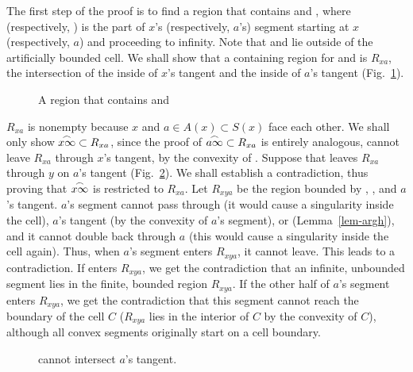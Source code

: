 The first step of the proof is to find a region that contains
 and , where  (respectively, 
) is the part of
$x$'s (respectively, $a$'s) segment starting at $x$ (respectively, $a$) 
and proceeding to infinity.
Note that  and  lie outside of the 
artificially bounded cell.
We shall show that a containing region for  and 
 is 
$R_{xa}$, the intersection of the inside of $x$'s tangent and the inside 
of $a$'s tangent 
(Fig.~\ref{fig-ax}).
%
\begin{figure}[tbp]\vspace{2in}\caption{A region that contains 
 and }\label{fig-ax}\end{figure}
%
$R_{xa}$ is nonempty because $x$ and $a \in A(x) \subset S(x)$ face each 
other.
We shall only show $\mbox{$\stackrel{\frown}{x\infty}$} \subset R_{xa}$, since the proof of 
$\mbox{$\stackrel{\frown}{a\infty}$} \subset R_{xa}$ is entirely analogous, 
 cannot leave $R_{xa}$ through $x$'s tangent, 
by the convexity of .
Suppose that  leaves $R_{xa}$ through
$y$ on $a$'s tangent (Fig.~\ref{fig.chick}).
We shall establish a contradiction, thus proving that $\mbox{$\stackrel{\frown}{x\infty}$}$ is 
restricted
to $R_{xa}$.
Let $R_{xya}$ be the region bounded by , , and $a$'s 
tangent.
$a$'s segment cannot pass through 
(it would cause a singularity inside the cell), $a$'s tangent (by 
the convexity of $a$'s segment), or  (Lemma~\ref{lem-argh}),
and it cannot double back through $a$
(this would cause a singularity inside the cell again).
Thus, when $a$'s segment enters $R_{xya}$, it cannot leave.
This leads to a contradiction.
If  enters $R_{xya}$, we get the contradiction that an 
infinite, 
unbounded segment lies in the finite, bounded region $R_{xya}$.
If the other half of $a$'s segment enters $R_{xya}$,
we get the contradiction that this segment cannot reach the boundary of the 
cell $C$ ($R_{xya}$ lies in the interior of $C$ by the convexity of $C$), 
although all convex segments originally start on a cell boundary.

\begin{figure}[bp]\vspace{2in}\caption{ cannot 
intersect $a$'s tangent.}\label{fig.chick}\end{figure}

